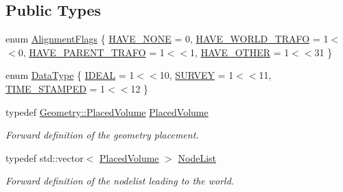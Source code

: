 \subsection*{Public Types}
\begin{DoxyCompactItemize}
\item 
enum \hyperlink{class_d_d4hep_1_1_alignments_1_1_alignment_data_a3fb06356abe173269ebc8fd920758357}{Alignment\+Flags} \{ \hyperlink{class_d_d4hep_1_1_alignments_1_1_alignment_data_a3fb06356abe173269ebc8fd920758357a39cb02a2920b8bdb2eedc7acb4850cb0}{H\+A\+V\+E\+\_\+\+N\+O\+NE} = 0, 
\hyperlink{class_d_d4hep_1_1_alignments_1_1_alignment_data_a3fb06356abe173269ebc8fd920758357a5313d8f5443b29d79e0a7224e792c77b}{H\+A\+V\+E\+\_\+\+W\+O\+R\+L\+D\+\_\+\+T\+R\+A\+FO} = 1$<$$<$0, 
\hyperlink{class_d_d4hep_1_1_alignments_1_1_alignment_data_a3fb06356abe173269ebc8fd920758357a826ef227187d7394b7b3e25de2a5b726}{H\+A\+V\+E\+\_\+\+P\+A\+R\+E\+N\+T\+\_\+\+T\+R\+A\+FO} = 1$<$$<$1, 
\hyperlink{class_d_d4hep_1_1_alignments_1_1_alignment_data_a3fb06356abe173269ebc8fd920758357a2dad19301a6794d458d3fc73c39f19cd}{H\+A\+V\+E\+\_\+\+O\+T\+H\+ER} = 1$<$$<$31
 \}
\item 
enum \hyperlink{class_d_d4hep_1_1_alignments_1_1_alignment_data_aaa782eebf5973a2c4e62065aee0fb7bb}{Data\+Type} \{ \hyperlink{class_d_d4hep_1_1_alignments_1_1_alignment_data_aaa782eebf5973a2c4e62065aee0fb7bba048ee5fdb4e1df4ca23db3fe394b257b}{I\+D\+E\+AL} = 1$<$$<$10, 
\hyperlink{class_d_d4hep_1_1_alignments_1_1_alignment_data_aaa782eebf5973a2c4e62065aee0fb7bbaa17c5923f6fe305c0f1f0d99940d8d3a}{S\+U\+R\+V\+EY} = 1$<$$<$11, 
\hyperlink{class_d_d4hep_1_1_alignments_1_1_alignment_data_aaa782eebf5973a2c4e62065aee0fb7bba35a70b0b654b7c0e05eb913790bd4fdc}{T\+I\+M\+E\+\_\+\+S\+T\+A\+M\+P\+ED} = 1$<$$<$12
 \}
\item 
typedef \hyperlink{class_d_d4hep_1_1_geometry_1_1_placed_volume}{Geometry\+::\+Placed\+Volume} \hyperlink{class_d_d4hep_1_1_alignments_1_1_alignment_data_aab2d43f5a4a4c2163e0a04905306525a}{Placed\+Volume}
\begin{DoxyCompactList}\small\item\em Forward definition of the geometry placement. \end{DoxyCompactList}\item 
typedef std\+::vector$<$ \hyperlink{class_d_d4hep_1_1_alignments_1_1_alignment_data_aab2d43f5a4a4c2163e0a04905306525a}{Placed\+Volume} $>$ \hyperlink{class_d_d4hep_1_1_alignments_1_1_alignment_data_a3a667fd798d7523d75accee832d64521}{Node\+List}
\begin{DoxyCompactList}\small\item\em Forward definition of the nodelist leading to the world. \end{DoxyCompactList}\item 

\end{DoxyCompactItemize}
